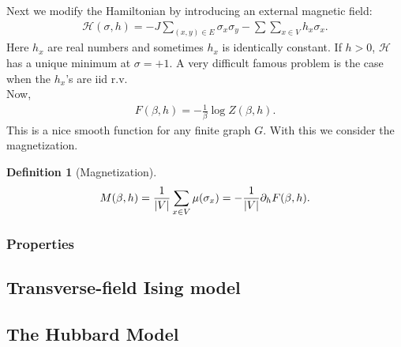 \documentclass{book}
\theoremstyle{definition}
\newtheorem{defn}{Definition}[section]
\newcommand{\p}{\partial}
\newcommand{\had}{\mathcal{H}}
\newcommand{\f}[2]{\frac{#1}{#2}}
\begin{document}
Next we modify the Hamiltonian by introducing an external magnetic field:
\begin{align}
\had(\sigma, h) = -J \sum_{(x,y)\in E} \sigma_x \sigma_y - \sum \sum_{x\in V} h_x \sigma_x.
\end{align}
Here $h_x$ are real numbers and sometimes $h_x$ is identically constant. If $h> 0$, $\had$ has a unique minimum at $\sigma = +1$. A very difficult famous problem is the case when the $h_x$'s are iid r.v. \\

Now, 
\begin{align}
F(\beta,h) = -\f{1}{\beta} \log Z(\beta,h).
\end{align}
This is a nice smooth function for any finite graph $G$. With this we consider the magnetization. 

\begin{defn}[Magnetization]
	\begin{align}
	M(\beta, h) = \f{1}{\abs{V}} \sum_{x\in V}\mu(\sigma_x) = -\f{1}{\abs{V}} \p_h F(\beta,h).
	\end{align}
\end{defn}



\subsubsection{Properties}







































\subsection{Transverse-field Ising model}



\subsection{The Hubbard Model}
\end{document}
